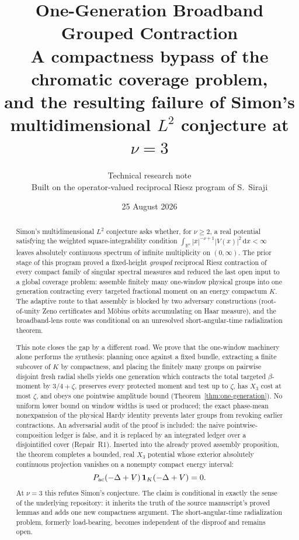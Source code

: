 \documentclass[11pt]{article}
\title{\textbf{One-Generation Broadband Grouped Contraction}\\[3pt]
\large A compactness bypass of the chromatic coverage problem,\\
and the resulting failure of Simon's multidimensional $L^2$ conjecture at $\nu=3$}
\author{Technical research note\\
\small Built on the operator-valued reciprocal Riesz program of S.~Siraji}
\date{25 August 2026}
\theoremstyle{remark}
\theoremstyle{definition}
\newcommand{\dd}{\,\mathrm d}
\newcommand{\ac}{{\rm ac}}
\begin{document}
\maketitle

\begin{abstract}
Simon's multidimensional $L^2$ conjecture asks whether, for $\nu\geq2$, a real
potential satisfying the weighted square-integrability condition
$\int_{\mathbb R^\nu}|x|^{-\nu+1}|V(x)|^2\dd x<\infty$ leaves absolutely
continuous spectrum of infinite multiplicity on $(0,\infty)$.  The prior stage
of this program proved a fixed-height \emph{grouped} reciprocal Riesz
contraction of every compact family of singular spectral measures and reduced
the last open input to a global coverage problem: assemble finitely many
one-window physical groups into one generation contracting every targeted
fractional moment on an energy compactum $K$.  The adaptive route to that
assembly is blocked by two adversary constructions (root-of-unity Zeno
certificates and M\"obius orbits accumulating on Haar measure), and the
broadband-lens route was conditional on an unresolved short-angular-time
radialization theorem.

This note closes the gap by a different road.  We prove that the one-window
machinery alone performs the synthesis: planning once against a fixed bundle,
extracting a finite subcover of $K$ by compactness, and placing the finitely
many groups on pairwise disjoint fresh radial shells yields one generation
which contracts the total targeted $\beta$-moment by $3/4+\zeta$, preserves
every protected moment and test up to $\zeta$, has $X_3$ cost at most $\zeta$,
and obeys one pointwise amplitude bound (Theorem~\ref{thm:one-generation}).
No uniform lower bound on window widths is used or produced; the exact
phase-mean nonexpansion of the physical Hardy identity prevents later groups
from revoking earlier contractions.  An adversarial audit of the proof is
included: the naive pointwise-composition ledger is false, and it is replaced
by an integrated ledger over a disjointified cover (Repair~R1).  Inserted into
the already proved assembly proposition, the theorem completes a bounded,
real $X_3$ potential whose exterior absolutely continuous projection vanishes
on a nonempty compact energy interval:
\[
 P_{\ac}(-\Delta+V)\,\mathbf 1_K(-\Delta+V)=0 .
\]
At $\nu=3$ this refutes Simon's conjecture.  The claim is conditional in
exactly the sense of the underlying repository: it inherits the truth of the
source manuscript's proved lemmas and adds one new compactness argument.
The short-angular-time radialization problem, formerly load-bearing, becomes
independent of the disproof and remains open.

\noindent{}
\end{abstract}
\end{document}
